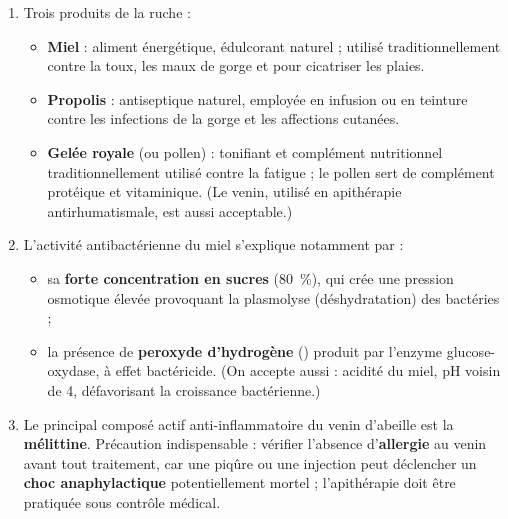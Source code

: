 \documentclass[11pt]{article}
\begin{document}
\begin{corrige}
\begin{enumerate}
\item Trois produits de la ruche :
\begin{itemize}
\item \textbf{Miel} : aliment énergétique, édulcorant naturel ; utilisé traditionnellement contre la toux, les maux de gorge et pour cicatriser les plaies.
\item \textbf{Propolis} : antiseptique naturel, employée en infusion ou en teinture contre les infections de la gorge et les affections cutanées.
\item \textbf{Gelée royale} (ou pollen) : tonifiant et complément nutritionnel traditionnellement utilisé contre la fatigue ; le pollen sert de complément protéique et vitaminique. (Le venin, utilisé en apithérapie antirhumatismale, est aussi acceptable.)
\end{itemize}
\item L'activité antibactérienne du miel s'explique notamment par :
\begin{itemize}
\item sa \textbf{forte concentration en sucres} (\SI{80}{\percent}), qui crée une pression osmotique élevée provoquant la plasmolyse (déshydratation) des bactéries ;
\item la présence de \textbf{peroxyde d'hydrogène} () produit par l'enzyme glucose-oxydase, à effet bactéricide. (On accepte aussi : acidité du miel, pH voisin de 4, défavorisant la croissance bactérienne.)
\end{itemize}
\item Le principal composé actif anti-inflammatoire du venin d'abeille est la \textbf{mélittine}. Précaution indispensable : vérifier l'absence d'\textbf{allergie} au venin avant tout traitement, car une piqûre ou une injection peut déclencher un \textbf{choc anaphylactique} potentiellement mortel ; l'apithérapie doit être pratiquée sous contrôle médical.
\end{enumerate}
\end{corrige}
\end{document}
